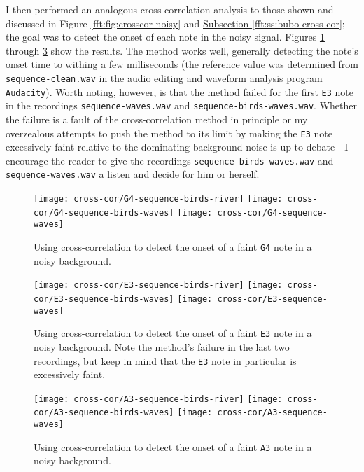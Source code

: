 \documentclass[11pt, a4paper]{article}
\begin{document}
I then performed an analogous cross-correlation analysis to those shown and discussed in Figure \ref{fft:fig:crosscor-noisy} and \hyperref[fft:ss:bubo-cross-cor]{Subsection \ref{fft:ss:bubo-cross-cor}}; the goal was to detect the onset of each note in the noisy signal. Figures \ref{fft:fig:G4-crosscor} through \ref{fft:fig:A3-crosscor} show the results. The method works well, generally detecting the note's onset time to withing a few milliseconds (the reference value was determined from \texttt{sequence-clean.wav} in the audio editing and waveform analysis program \texttt{Audacity}). Worth noting, however, is that the method failed for the first \texttt{E3} note in the recordings \texttt{sequence-waves.wav} and \texttt{sequence-birds-waves.wav}. Whether the failure is a fault of the cross-correlation method in principle or my overzealous attempts to push the method to its limit by making the \texttt{E3} note excessively faint relative to the dominating background noise is up to debate---I encourage the reader to give the recordings \texttt{sequence-birds-waves.wav} and \texttt{sequence-waves.wav} a listen and decide for him or herself. 


\begin{figure}[htb!]
	\centering
	\texttt{[image: cross-cor/G4-sequence-birds-river]}\vfill  
	\texttt{[image: cross-cor/G4-sequence-birds-waves]}\vfill  
	\texttt{[image: cross-cor/G4-sequence-waves]}\vfill  
	\caption{Using cross-correlation to detect the onset of a faint \texttt{G4} note in a noisy background.}
	\label{fft:fig:G4-crosscor}
\end{figure}

\begin{figure}[htb!]
	\centering
	\texttt{[image: cross-cor/E3-sequence-birds-river]}\vfill  
	\texttt{[image: cross-cor/E3-sequence-birds-waves]}\vfill  
	\texttt{[image: cross-cor/E3-sequence-waves]}\vfill  
	\caption{Using cross-correlation to detect the onset of a faint \texttt{E3} note in a noisy background. Note the method's failure in the last two recordings, but keep in mind that the \texttt{E3} note in particular is excessively faint.}
	\label{fft:fig:E3-crosscor}
\end{figure}

\begin{figure}[htb!]
	\centering
	\texttt{[image: cross-cor/A3-sequence-birds-river]}\vfill  
	\texttt{[image: cross-cor/A3-sequence-birds-waves]}\vfill  
	\texttt{[image: cross-cor/A3-sequence-waves]}\vfill  
	\caption{Using cross-correlation to detect the onset of a faint \texttt{A3} note in a noisy background.}
	\label{fft:fig:A3-crosscor}
\end{figure}
\end{document}
